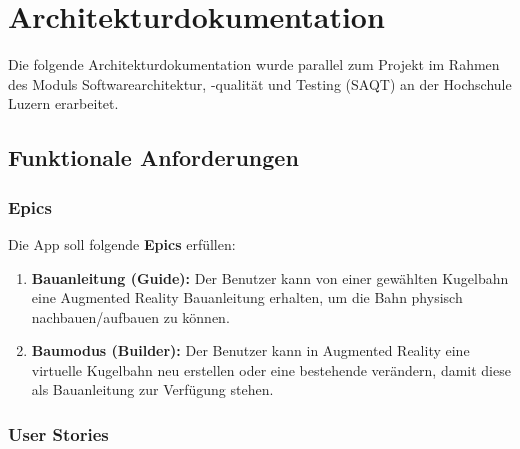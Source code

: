 \section{Architekturdokumentation}\label{appendix:architekturdokumentation}

Die folgende Architekturdokumentation wurde parallel zum Projekt im Rahmen des Moduls Softwarearchitektur, -qualität und Testing (SAQT) an der Hochschule Luzern erarbeitet.

\subsection{Funktionale Anforderungen}\label{appendix:funktionale-anforderungen}
\subsubsection{Epics}
Die App soll folgende \textbf{Epics} erfüllen:
\begin{enumerate}
	\item \textbf{Bauanleitung (Guide):} Der Benutzer kann von einer gewählten Kugelbahn eine Augmented Reality Bauanleitung erhalten, um die Bahn physisch nachbauen/aufbauen zu können.
	\item \textbf{Baumodus (Builder):} Der Benutzer kann in Augmented Reality eine virtuelle Kugelbahn neu erstellen oder eine bestehende verändern, damit diese als Bauanleitung zur Verfügung stehen.
\end{enumerate}

\subsubsection{User Stories}\label{appendix:user-stories}


